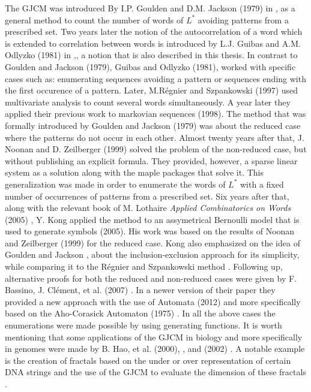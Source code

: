 \documentclass[12pt]{report}
\begin{document}
{{The GJCM was introduced By I.P. Goulden and D.M. Jackson (1979) in \cite{GJ1979},\cite{GJ1983} as a general method to count the number of words of $L^*$ avoiding patterns from a prescribed set. Two years later the notion of the autocorrelation of a word which is extended to correlation between words is introduced by L.J. Guibas and A.M. Odlyzko (1981) in \cite{GO1981},\cite{GO21981}, a notion that is also described in this thesis. In contrast to Goulden and Jackson (1979)\cite{GJ1979}, Guibas and Odlyzko (1981)\cite{GO1981},\cite{GO21981} worked with specific cases such as: enumerating sequences avoiding a pattern or sequences ending with the first occurence of a pattern. Later, M.Régnier and Szpankowski (1997) \cite{RS1997} used multivariate analysis to count several words simultaneously. A year later they applied their previous work to markovian sequences (1998)\cite{RS1998}. The method that was formally introduced by Goulden and Jackson (1979)\cite{GJ1979} was about the reduced case where the patterns do not occur in each other. Almost twenty years after that, J. Noonan and D. Zeilberger (1999) \cite{NZ1999} solved the problem of the non-reduced case, but without publishing an explicit formula. They provided, however, a sparse linear system as a solution along with the maple packages that solve it. This generalization was made in order to enumerate the words of $L^*$ with a fixed number of occurrences of patterns from a prescribed set. Six years after that, along with the relevant book of M. Lothaire {\em Applied Combinatorics on Words} (2005) \cite{L2005}, Y. Kong applied the method to an assymetrical Bernoulli model that is used to generate symbols (2005)\cite{K2005}. His work was based on the results of Noonan and Zeilberger (1999) \cite{NZ1999} for the reduced case.
Kong also emphasized on the idea of Goulden and Jackson \cite{GJ1979},\cite{GJ1983} about the inclusion-exclusion approach for its simplicity, while comparing it to the Régnier and Szpankowski method \cite{RS1997}. Following up, alternative proofs for both the reduced and non-reduced cases were given by F. Bassino, J. Clément, et al. (2007) \cite{BCFN2007}. In a newer version of their paper they provided a new approach with the use of Automata (2012)\cite{BCN2012} and more specifically based on the Aho-Corasick Automaton (1975) \cite{AC1975}. In all the above cases the enumerations were made possible by using generating functions. It is worth mentioning that some applications of the GJCM in biology and more specifically in genomes were made by B. Hao, et al. (2000)\cite{H2000}, \cite{HXYC2000}, \cite{2HXYC2000} and (2002) \cite{XB2002}. A notable example is the creation of fractals based on the under or over representation of certain DNA strings and the use of the GJCM to evaluate the dimension of these fractals \cite{H2000}.


}}
\end{document}
